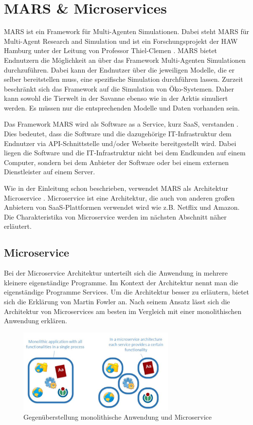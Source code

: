 \documentclass{llncs}
\begin{document}
\section{MARS \& Microservices}
MARS ist ein Framework für Multi-Agenten Simulationen. Dabei steht MARS für Multi-Agent Research and Simulation und ist ein Forschungsprojekt der HAW Hamburg unter der Leitung von Professor Thiel-Clemen \cite{mars, Huening2016}. MARS bietet Endnutzern die Möglichkeit an über das Framework Multi-Agenten Simulationen durchzuführen. Dabei kann der Endnutzer über die jeweiligen Modelle, die er selber bereitstellen muss, eine spezifische Simulation durchführen lassen. Zurzeit beschränkt sich das Framework auf die Simulation von Öko-Systemen. Daher kann sowohl die Tierwelt in der Savanne ebenso wie in der Arktis simuliert werden. Es müssen nur die entsprechenden Modelle und Daten vorhanden sein.

Das Framework MARS wird als Software as a Service, kurz SaaS, verstanden \cite{Huening2016}. Dies bedeutet, dass die Software und die dazugehörige IT-Infrastruktur dem Endnutzer via API-Schnittstelle und/oder Webseite bereitgestellt wird. Dabei liegen die Software und die IT-Infrastruktur nicht bei dem Endkunden auf einem Computer, sondern bei dem Anbieter der Software oder bei einem externen Dienstleister auf einem Server.

Wie in der Einleitung schon beschrieben, verwendet MARS als Architektur Microservice \cite{Huening2016}.  Microservice ist eine Architektur, die auch von anderen großen Anbietern von SaaS-Plattformen verwendet wird wie z.B. Netflix und Amazon\cite{pattern, heise}. Die Charakteristika von Microservice werden im nächsten Abschnitt näher erläutert.
\subsection{Microservice}
Bei der Microservice Architektur unterteilt sich die Anwendung in mehrere kleinere eigenständige Programme. Im  Kontext der Architektur nennt man die eigenständige Programme Services. Um die Architektur besser zu erläutern, bietet sich die Erklärung von Martin Fowler an. Nach seinem Ansatz lässt sich die Architektur von Microservices am besten im Vergleich mit einer monolithischen Anwendung erklären\cite{fowler2014}. 

\begin{figure}[htbp]
  \centering
      \includegraphics[width=0.7\textwidth]{monolithMicroservice.PNG}
    \caption{Gegenüberstellung monolithische Anwendung und Microservice \cite{locloud}}
    \label{fig:PyramideGoogle}
\end{figure}
\end{document}
